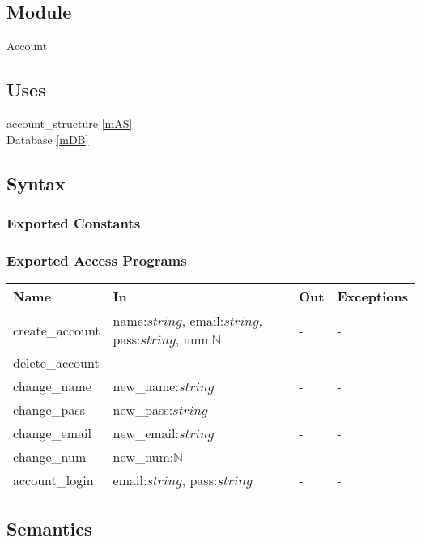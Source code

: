\documentclass[12pt, titlepage]{article}
\begin{document}
\subsection{Module}

Account

\subsection{Uses}

account\_structure \ref{mAS} \\
Database \ref{mDB}

\subsection{Syntax}

\subsubsection{Exported Constants}

\subsubsection{Exported Access Programs}

\begin{center}
\begin{tabular}{p{3cm} p{9cm} p{2cm} p{2cm}}
\hline
\textbf{Name} & \textbf{In} & \textbf{Out} & \textbf{Exceptions} \\
\hline
create\_account & name:$string$, email:$string$, pass:$string$, num:$\mathbb{N}$ & - & - \\
delete\_account & - & - & - \\
change\_name & new\_name:$string$ & - & - \\
change\_pass & new\_pass:$string$ & - & - \\
change\_email & new\_email:$string$ & - & - \\
change\_num & new\_num:$\mathbb{N}$ & - & - \\
account\_login & email:$string$, pass:$string$ & - & - \\
\hline
\end{tabular}
\end{center}

\subsection{Semantics}
\end{document}

